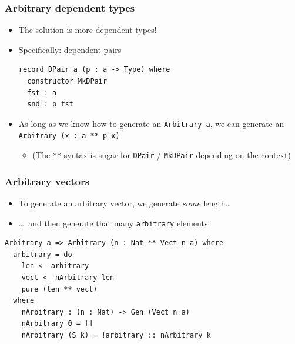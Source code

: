\documentclass[compress,handout]{beamer}
\begin{document}
\begin{frame}[fragile]
  \frametitle{Arbitrary dependent types}

  \begin{itemize}
    \item<1-> The solution is more dependent types!
    \item<2-> Specifically: dependent pairs

    \begin{verbatim}
record DPair a (p : a -> Type) where
  constructor MkDPair
  fst : a
  snd : p fst
    \end{verbatim}

    \item<3-> As long as we know how to generate an {\textasciigrave
              \texttt{Arbitrary a}\textasciigrave}, we can generate
              an {\textasciigrave
              \texttt{Arbitrary (x : a ** p x)}\textasciigrave}
    \begin{itemize}
      \item<3-> (The \texttt{**} syntax is sugar for
                \texttt{DPair} / \texttt{MkDPair}
                depending on the context)
    \end{itemize}
  \end{itemize}

\end{frame}


\begin{frame}[fragile]
  \frametitle{Arbitrary vectors}

  \begin{itemize}
  \item<1-> To generate an arbitrary vector, we generate \textit{some}
            length\dots
  \item<2-> \dots\ and then generate that many \texttt{arbitrary}
            elements
  \end{itemize}

  \pause

  \begin{verbatim}
Arbitrary a => Arbitrary (n : Nat ** Vect n a) where
  arbitrary = do
    len <- arbitrary
    vect <- nArbitrary len
    pure (len ** vect)
  where
    nArbitrary : (n : Nat) -> Gen (Vect n a)
    nArbitrary 0 = []
    nArbitrary (S k) = !arbitrary :: nArbitrary k
  \end{verbatim}

  \vspace*{-5mm}

\end{frame}
\end{document}
